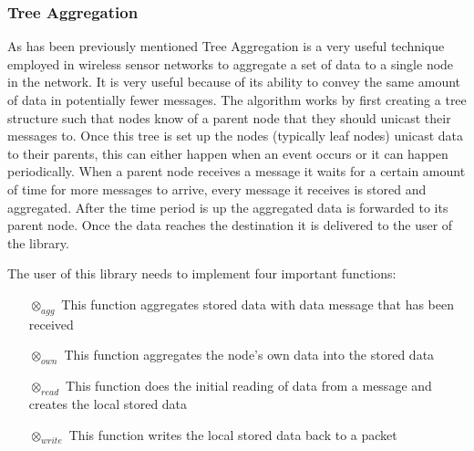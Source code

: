 \subsubsection{Tree Aggregation}

As has been previously mentioned Tree Aggregation is a very useful technique employed in wireless sensor networks to aggregate a set of data to a single node in the network. It is very useful because of its ability to convey the same amount of data in potentially fewer messages. The algorithm works by first creating a tree structure such that nodes know of a parent node that they should unicast their messages to. Once this tree is set up the nodes (typically leaf nodes) unicast data to their parents, this can either happen when an event occurs or it can happen periodically. When a parent node receives a message it waits for a certain amount of time for more messages to arrive, every message it receives is stored and aggregated. After the time period is up the aggregated data is forwarded to its parent node. Once the data reaches the destination it is delivered to the user of the library.


The user of this library needs to implement four important functions:
\begin{enumerate}
\item[$\otimes_{agg}$] This function aggregates stored data with data message that has been received
\item[$\otimes_{own}$] This function aggregates the node's own data into the stored data
\item[$\otimes_{read}$] This function does the initial reading of data from a message and creates the local stored data
\item[$\otimes_{write}$] This function writes the local stored data back to a packet
\end{enumerate}


